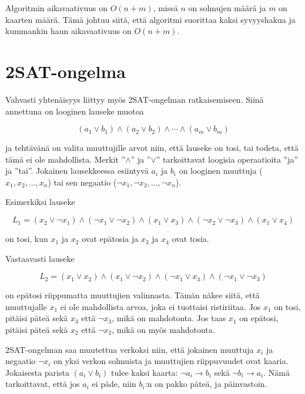Algoritmin aikavaativuus on $O(n+m)$,
missä $n$ on solmujen määrä ja $m$ on kaarten määrä.
Tämä johtuu siitä,
että algoritmi suorittaa kaksi syvyyshakua ja
kummankin haun aikavaativuus on $O(n+m)$.

\section{2SAT-ongelma}


Vahvasti yhtenäisyys liittyy myös 2SAT-ongelman ratkaisemiseen.
Siinä annettuna on looginen lauseke muotoa

\[
(a_1 \lor b_1) \land (a_2 \lor b_2) \land \cdots \land (a_m \lor b_m)
\]

ja tehtävänä on valita muuttujille arvot niin,
että lauseke on tosi,
tai todeta, että tämä ei ole mahdollista.
Merkit ''$\land$'' ja ''$\lor$'' tarkoittavat
loogisia operaatioita ''ja'' ja ''tai''.
Jokainen lausekkeessa esiintyvä $a_i$ ja $b_i$ on looginen muuttuja
($x_1,x_2,\ldots,x_n$)
tai sen negaatio ($\lnot x_1, \lnot x_2, \ldots, \lnot x_n$).

Esimerkiksi lauseke

\[
L_1 = (x_2 \lor \lnot x_1) \land
      (\lnot x_1 \lor \lnot x_2) \land
      (x_1 \lor x_3) \land
      (\lnot x_2 \lor \lnot x_3) \land
      (x_1 \lor x_4)
\]

on tosi, kun $x_1$ ja $x_2$ ovat epätosia
ja $x_3$ ja $x_4$ ovat tosia.

Vastaavasti lauseke

\[
L_2 = (x_1 \lor x_2) \land
      (x_1 \lor \lnot x_2) \land
      (\lnot x_1 \lor x_3) \land
      (\lnot x_1 \lor \lnot x_3)
\]

on epätosi riippumatta muuttujien valinnasta.
Tämän näkee siitä, että muuttujalle $x_1$
ei ole mahdollista arvoa, joka ei tuottaisi ristiriitaa.
Jos $x_1$ on tosi, pitäisi päteä sekä $x_3$ että $\lnot x_3$,
mikä on mahdotonta.
Jos taas $x_1$ on epätosi,
pitäisi päteä sekä $x_2$ että $\lnot x_2$,
mikä on myös mahdotonta.

2SAT-ongelman saa muutettua verkoksi niin,
että jokainen muuttuja $x_i$ ja negaatio $\lnot x_i$
on yksi verkon solmuista
ja muuttujien riippuvuudet ovat kaaria.
Jokaisesta parista $(a_i \lor b_i)$ tulee kaksi
kaarta: $\lnot a_i \to b_i$ sekä $\lnot b_i \to a_i$.
Nämä tarkoittavat, että jos $a_i$ ei päde,
niin $b_i$:n on pakko päteä, ja päinvastoin.


